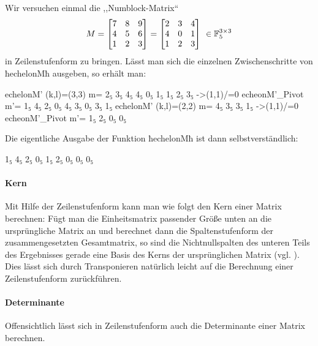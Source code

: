 

\begin{beispiel}
  Wir versuchen einmal die ,,Numblock-Matrix`` 
  \[ M = \begin{bmatrix} 7&8&9\\ 4&5&6\\ 1&2&3\end{bmatrix} = 
      \begin{bmatrix}2&3&4 \\ 4&0&1\\ 1&2&3\end{bmatrix} \ 
      \in \F_5^{3\times 3}\]
  in Zeilenstufenform zu bringen. Lässt man sich die einzelnen 
  Zwischenschritte von ħechelonMħ ausgeben, so erhält man:
  \begin{hcode}
echelonM' (k,l)=(3,3) m=
2₅ 3₅ 4₅ 
4₅ 0₅ 1₅ 
1₅ 2₅ 3₅ 
	->(1,1)/=0
echeonM'_Pivot m'=
1₅ 4₅ 2₅ 
0₅ 4₅ 3₅ 
0₅ 3₅ 1₅
echelonM' (k,l)=(2,2) m=
4₅ 3₅ 
3₅ 1₅ 
	->(1,1)/=0
echeonM'_Pivot m'=
1₅ 2₅ 
0₅ 0₅ 
  \end{hcode}
  Die eigentliche Ausgabe der Funktion ħechelonMħ ist dann selbstverständlich:
\begin{hcode}
1₅ 4₅ 2₅ 
0₅ 1₅ 2₅ 
0₅ 0₅ 0₅ 
\end{hcode}
\end{beispiel}


\paragraph{Kern} Mit Hilfe der Zeilenstufenform kann man wie folgt den Kern 
einer Matrix berechnen: Fügt man die Einheitsmatrix passender Größe unten an
die ursprüngliche Matrix an und berechnet dann die Spaltenstufenform der
zusammengesetzten Gesamtmatrix, so sind die Nichtnullspalten des unteren Teils
des Ergebnisses gerade eine Basis des Kerns der ursprünglichen Matrix (vgl.
\cite[Abschnitt Basis]{wiki:matrix-kernel}). Dies lässt sich durch
Transponieren natürlich leicht auf die Berechnung einer Zeilenstufenform
zurückführen.


\paragraph{Determinante} Offensichtlich lässt sich in Zeilenstufenform auch
die Determinante einer Matrix berechnen.


